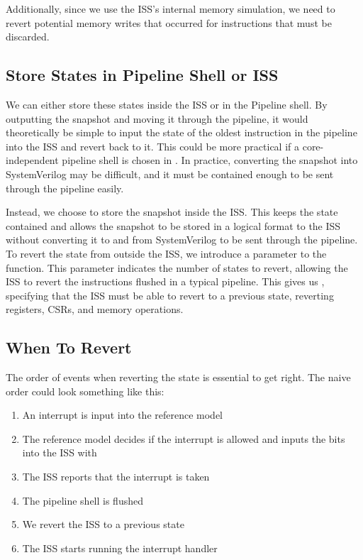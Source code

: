 Additionally, since we use the ISS's internal memory simulation, we need to revert potential memory writes that occurred for instructions that must be discarded.


\subsection{Store States in Pipeline Shell or ISS}

We can either store these states inside the ISS or in the Pipeline shell. By outputting the snapshot and moving it through the pipeline, it would theoretically be simple to input the state of the oldest instruction in the pipeline into the ISS and revert back to it. This could be more practical if a core-independent pipeline shell is chosen in . In practice, converting the snapshot into SystemVerilog may be difficult, and it must be contained enough to be sent through the pipeline easily. %

Instead, we choose to store the snapshot inside the ISS. This keeps the state contained and allows the snapshot to be stored in a logical format to the ISS without converting it to and from SystemVerilog to be sent through the pipeline. 
To revert the state from outside the ISS, we introduce a  parameter to the  function. This parameter indicates the number of states to revert, allowing the ISS to revert the instructions flushed in a typical pipeline.
This gives us , specifying that the ISS must be able to revert to a previous state, reverting registers, CSRs, and memory operations.

\subsection{When To Revert}
\label{sec:ps_when_revert}

The order of events when reverting the state is essential to get right.
The naive order could look something like this:

\begin{enumerate}
    \item An interrupt is input into the reference model
    \item The reference model decides if the interrupt is allowed and inputs the  bits into the ISS with 
    \item The ISS reports that the interrupt is taken
    \item The pipeline shell is flushed
    \item We revert the ISS to a previous state
    \item The ISS starts running the interrupt handler
\end{enumerate}

